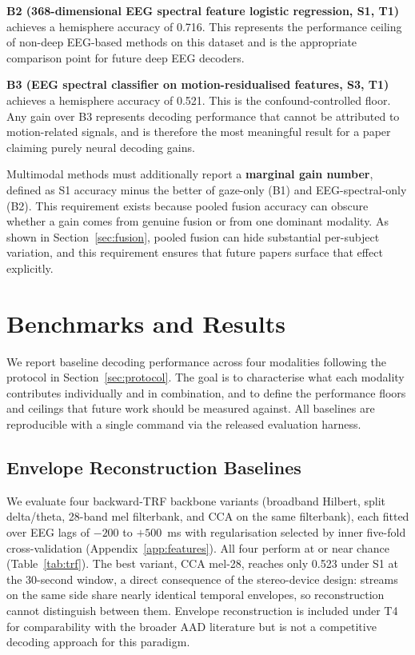 \documentclass{article}
\begin{document}
\textbf{B2 (368-dimensional EEG spectral feature logistic regression, S1, 
T1)} achieves a hemisphere accuracy of 0.716. This represents the performance 
ceiling of non-deep EEG-based methods on this dataset and is the appropriate 
comparison point for future deep EEG decoders.

\textbf{B3 (EEG spectral classifier on motion-residualised features, S3, T1)} 
achieves a hemisphere accuracy of 0.521. This is the confound-controlled floor. 
Any gain over B3 represents decoding performance that cannot be attributed to 
motion-related signals, and is therefore the most meaningful result for a paper 
claiming purely neural decoding gains.

Multimodal methods must additionally report a \textbf{marginal gain number}, defined 
as S1 accuracy minus the better of gaze-only (B1) and EEG-spectral-only (B2). 
This requirement exists because pooled fusion accuracy can obscure whether a 
gain comes from genuine fusion or from one dominant modality. As shown in 
Section~\ref{sec:fusion}, pooled fusion can hide substantial per-subject 
variation, and this requirement ensures that future papers surface that effect 
explicitly.


\section{Benchmarks and Results}
\label{sec:benchmarks}

We report baseline decoding performance across four modalities following the
protocol in Section~\ref{sec:protocol}. The goal is to characterise what each
modality contributes individually and in combination, and to define the
performance floors and ceilings that future work should be measured against.
All baselines are reproducible with a single command via the released
evaluation harness.

\subsection{Envelope Reconstruction Baselines}
\label{sec:trf}

We evaluate four backward-TRF backbone variants (broadband Hilbert, split
delta/theta, 28-band mel filterbank, and CCA on the same filterbank), each
fitted over EEG lags of $-200$ to $+500$~ms with regularisation selected by
inner five-fold cross-validation (Appendix~\ref{app:features}). All four
perform at or near chance (Table~\ref{tab:trf}). The best variant, CCA
mel-28, reaches only 0.523 under S1 at the 30-second window, a direct
consequence of the stereo-device design: streams on the same side share
nearly identical temporal envelopes, so reconstruction cannot distinguish
between them. Envelope reconstruction is included under T4 for comparability
with the broader AAD literature but is not a competitive decoding approach
for this paradigm.
\end{document}

